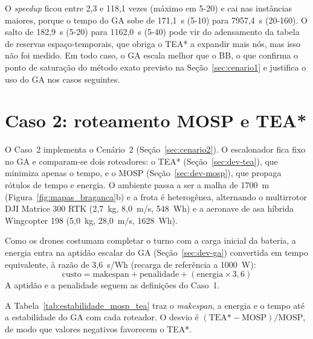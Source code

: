 O \textit{speedup} ficou entre 2,3 e 118,1 vezes (máximo em 5-20) e cai nas instâncias maiores, porque o tempo do GA sobe de 171,1~s (5-10) para 7957,4~s (20-160). O salto de 182,9~s (5-20) para 1162,0~s (5-40) pode vir do adensamento da tabela de reservas espaço-temporais, que obriga o TEA* a expandir mais nós, mas isso não foi medido. Em todo caso, o GA escala melhor que o BB, o que confirma o ponto de saturação do método exato previsto na Seção~\ref{sec:cenario1} e justifica o uso do GA nos casos seguintes.

\section{Caso 2: roteamento MOSP e TEA*}\label{sec:caso2}

O Caso~2 implementa o Cenário~2 (Seção~\ref{sec:cenario2}). O escalonador fica fixo no GA e comparam-se dois roteadores: o TEA* (Seção~\ref{sec:dev-tea}), que minimiza apenas o tempo, e o MOSP (Seção~\ref{sec:dev-mosp}), que propaga rótulos de tempo e energia. O ambiente passa a ser a malha de 1700~m (Figura~\ref{fig:mapas_braganca}b) e a frota é heterogênea, alternando o multirrotor DJI Matrice 300 RTK (2,7~kg, 8,0~m/s, 548~Wh) e a aeronave de asa híbrida Wingcopter 198 (5,0~kg, 28,0~m/s, 1628~Wh).

Como os drones costumam completar o turno com a carga inicial da bateria, a energia entra na aptidão escalar do GA (Seção~\ref{sec:dev-ga}) convertida em tempo equivalente, à razão de 3,6~s/Wh (recarga de referência a 1000~W):
\begin{equation}\label{eq:custo_agregado}
\text{custo} = \text{makespan} + \text{penalidade} + (\text{energia} \times 3{,}6)
\end{equation}
A aptidão e a penalidade seguem as definições do Caso~1.

A Tabela~\ref{tab:estabilidade_mosp_tea} traz o \textit{makespan}, a energia e o tempo até a estabilidade do GA com cada roteador. O desvio é $(\text{TEA*}-\text{MOSP})/\text{MOSP}$, de modo que valores negativos favorecem o TEA*.

